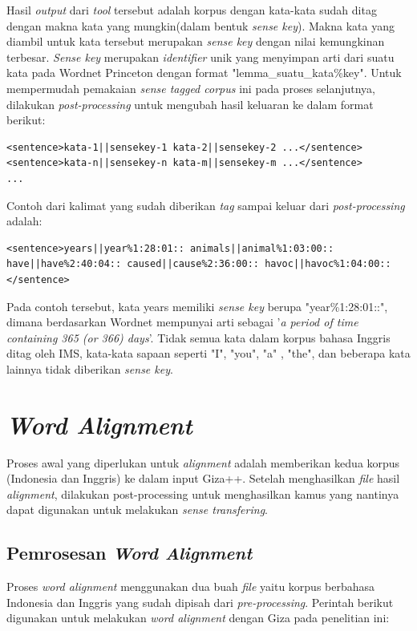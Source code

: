 Hasil \textit{output} dari \textit{tool} tersebut adalah korpus dengan kata-kata sudah ditag dengan makna kata yang mungkin(dalam bentuk \textit{sense key}). Makna kata yang diambil untuk kata tersebut merupakan \textit{sense key} dengan nilai kemungkinan terbesar. \textit{Sense key} merupakan \textit{identifier} unik yang menyimpan arti dari suatu kata pada Wordnet Princeton dengan format "lemma\_suatu\_kata\%key". Untuk mempermudah pemakaian \textit{sense tagged corpus} ini pada proses selanjutnya, dilakukan \textit{post-processing} untuk mengubah hasil keluaran ke dalam format berikut:

\begin{lstlisting}
<sentence>kata-1||sensekey-1 kata-2||sensekey-2 ...</sentence>
<sentence>kata-n||sensekey-n kata-m||sensekey-m ...</sentence>
...
\end{lstlisting}

Contoh dari kalimat yang sudah diberikan \textit{tag} sampai keluar dari \textit{post-processing} adalah:

\begin{lstlisting}
<sentence>years||year%1:28:01:: animals||animal%1:03:00:: have||have%2:40:04:: caused||cause%2:36:00:: havoc||havoc%1:04:00::</sentence>
\end{lstlisting}

Pada contoh tersebut, kata years memiliki \textit{sense key} berupa "year\%1:28:01::", dimana berdasarkan Wordnet mempunyai arti sebagai '\textit{a period of time containing 365 (or 366) days}'. Tidak semua kata dalam korpus bahasa Inggris ditag oleh IMS, kata-kata sapaan seperti "I", "you", "a" , "the", dan beberapa kata lainnya tidak diberikan \textit{sense key}.  



\section{\textit{Word Alignment}}

Proses awal yang diperlukan untuk \textit{alignment} adalah memberikan kedua korpus (Indonesia dan Inggris) ke dalam input Giza++. Setelah menghasilkan \textit{file} hasil \textit{alignment}, dilakukan post-processing untuk menghasilkan kamus yang nantinya dapat digunakan untuk melakukan \textit{sense transfering}.

\subsection{Pemrosesan \textit{Word Alignment}}
Proses \textit{word alignment} menggunakan dua buah \textit{file} yaitu korpus berbahasa Indonesia dan Inggris yang sudah dipisah dari \textit{pre-processing}. Perintah berikut digunakan untuk melakukan \textit{word alignment} dengan Giza pada penelitian ini:

